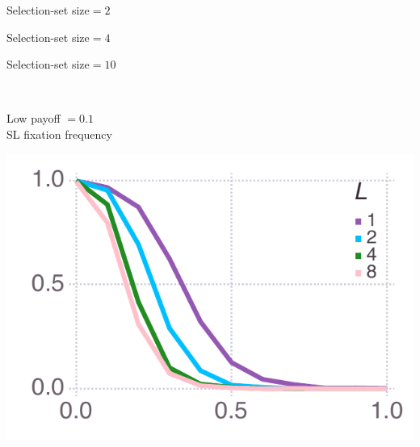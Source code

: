\documentclass[varwidth=true,crop=false]{standalone}
\newcommand{\pisub}[1]{\pi_{\mathrm{#1}}}
\newcommand{\pilow}{\pisub{low}}
\newcommand{\meanvar}[1]{\langle #1 \rangle}
\newcommand{\meansl}{\meanvar{s}}
\begin{document}
    \begin{minipage}{3.75in}
      \centering
      {\hspace{5.25em}\huge Selection-set size$ = 2$}
    \end{minipage}%
    \begin{minipage}{3.75in}
      \centering
      {\hspace{3.0em}\huge Selection-set size$ = 4$}
    \end{minipage}%
    \begin{minipage}{3.75in}
      \centering
      {\hspace{3.0em}\huge Selection-set size$ = 10$}
    \end{minipage}~\\

    \begin{minipage}{3.75in}
    \begin{rotate}{90}
      {\parbox{3.0in}{
          \centering
          \vspace{-1.0em}\hspace{-2.5em} {\huge Low payoff $ = 0.1$} \\[1em]
          {\huge SL fixation frequency}
      }}
    \end{rotate}%
    \hspace{2em}
      \includegraphics[width=\textwidth]{mean_social_learner_over_u_lowpayoff=0.1_nbehaviors=2.pdf}
    \end{minipage}\noindent\hspace{1.25em}
\end{document}
